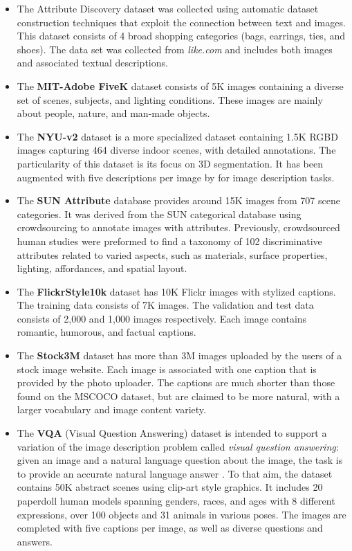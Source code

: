 \begin{itemize}
\item The Attribute Discovery dataset \citep{Berg2010} was collected using automatic dataset construction techniques that exploit the connection between text and images. This dataset consists of 4 broad shopping categories (bags, earrings, ties, and shoes). The data set was collected from \textit{like.com} and includes both images and associated textual descriptions.
\item The \textbf{MIT-Adobe FiveK} \citep{Bychkovsky2011} dataset consists of 5K images containing a diverse set of scenes, subjects, and lighting conditions. These images are mainly about people, nature, and man-made objects.
\item The \textbf{NYU-v2} dataset \citep{Silberman2012} is a more specialized dataset containing 1.5K RGBD images capturing 464 diverse indoor scenes, with detailed annotations. The particularity of this dataset is its focus on 3D segmentation. It has been augmented with five descriptions per image by \citet{Lin2015} for image description tasks.
\item The \textbf{SUN Attribute} database \citet{Patterson2014} provides around 15K  images from 707 scene categories. It was derived from the SUN categorical database using crowdsourcing to annotate images with attributes. Previously, crowdsourced human studies were preformed to find a taxonomy of 102 discriminative attributes related to varied aspects, such as materials, surface properties, lighting, affordances, and spatial layout.
\item The \textbf{FlickrStyle10k} dataset has 10K Flickr images with stylized captions. The training data consists of 7K images. The validation and test data consists of 2,000 and 1,000 images respectively. Each image contains romantic, humorous, and factual captions.
\item  The \textbf{Stock3M} dataset \citep{Wang2017} has more than 3M images uploaded by the users of a stock image website. Each image is associated with one caption that is provided by the photo uploader. The captions are much shorter than those found on the MSCOCO dataset, but are claimed to be more natural, with a larger vocabulary and image content variety.
\item The \textbf{VQA} (Visual Question Answering) dataset is intended to support a variation of the image description problem called \textit{visual question answering}: given an image and a natural language question about the image, the task is to provide an accurate natural language answer \citep{Antol2015}. To that aim, the dataset contains 50K abstract scenes using clip-art style graphics. It includes 20 paperdoll human models spanning genders, races, and ages with 8 different expressions, over 100 objects and 31 animals in various poses. The images are completed with five captions per image, as well as diverse questions and answers.
\end{itemize}

